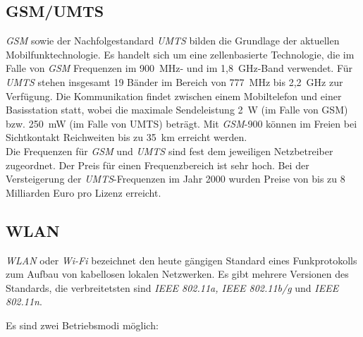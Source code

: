     \subsection{GSM/UMTS}
        \emph{GSM} sowie der Nachfolgestandard \emph{UMTS} bilden die Grundlage der aktuellen Mobilfunktechnologie.
        Es handelt sich um eine zellenbasierte Technologie, die im Falle von \emph{GSM} Frequenzen im
        900~MHz- und im 1,8~GHz-Band verwendet. Für \emph{UMTS} stehen insgesamt 19 Bänder im Bereich von 777~MHz 
        bis 2,2~GHz zur Verfügung. Die Kommunikation findet zwischen einem Mobiltelefon und einer
        Basisstation statt, wobei die maximale Sendeleistung 2~W (im Falle von GSM) bzw. 250~mW (im Falle
        von UMTS) beträgt. Mit \emph{GSM}-900 können im Freien bei Sichtkontakt Reichweiten bis zu 35~km erreicht
        werden. \cite{Mobilfunk}
        \\
        Die Frequenzen für \emph{GSM} und \emph{UMTS} sind fest dem jeweiligen Netzbetreiber zugeordnet. Der Preis
        für einen Frequenzbereich ist sehr hoch. Bei der Versteigerung der \emph{UMTS}-Frequenzen im  
        Jahr 2000 wurden Preise von bis zu 8 Milliarden Euro pro Lizenz erreicht. \cite{umts_versteigerung} 

    \subsection{WLAN}\label{wlan}

            \emph{WLAN} oder \emph{Wi-Fi} bezeichnet den heute gängigen Standard eines Funkprotokolls zum Aufbau
            von kabellosen lokalen Netzwerken. Es gibt mehrere Versionen des Standards, die verbreitetsten
            sind \emph{IEEE 802.11a, IEEE 802.11b/g} und \emph{IEEE 802.11n}. \cite{ieee_wlan}

            Es sind zwei Betriebsmodi möglich:

